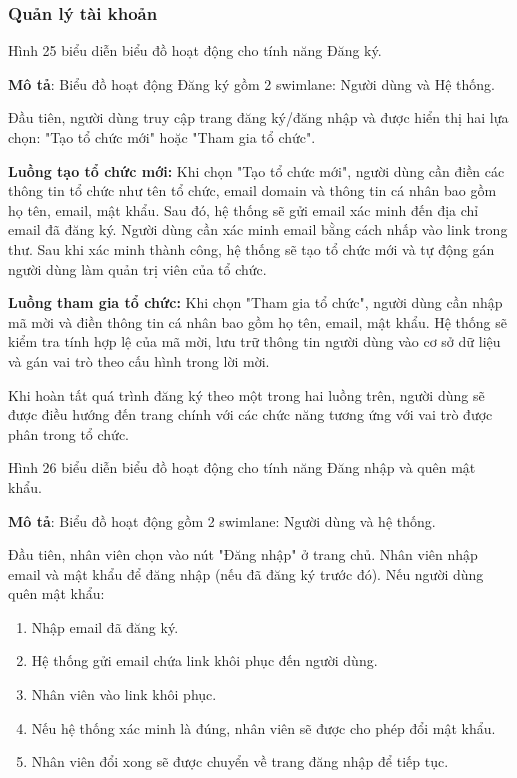 \subsubsection{Quản lý tài khoản}
Hình 25 biểu diễn biểu đồ hoạt động cho tính năng Đăng ký.

\textbf{Mô tả}: Biểu đồ hoạt động Đăng ký gồm 2 swimlane: Người dùng và Hệ thống.

Đầu tiên, người dùng truy cập trang đăng ký/đăng nhập và được hiển thị hai lựa chọn: "Tạo tổ chức mới" hoặc "Tham gia tổ chức". 

\textbf{Luồng tạo tổ chức mới:}
Khi chọn "Tạo tổ chức mới", người dùng cần điền các thông tin tổ chức như tên tổ chức, email domain và thông tin cá nhân bao gồm họ tên, email, mật khẩu. Sau đó, hệ thống sẽ gửi email xác minh đến địa chỉ email đã đăng ký. Người dùng cần xác minh email bằng cách nhấp vào link trong thư. Sau khi xác minh thành công, hệ thống sẽ tạo tổ chức mới và tự động gán người dùng làm quản trị viên của tổ chức.

\textbf{Luồng tham gia tổ chức:}
Khi chọn "Tham gia tổ chức", người dùng cần nhập mã mời và điền thông tin cá nhân bao gồm họ tên, email, mật khẩu. Hệ thống sẽ kiểm tra tính hợp lệ của mã mời, lưu trữ thông tin người dùng vào cơ sở dữ liệu và gán vai trò theo cấu hình trong lời mời.

Khi hoàn tất quá trình đăng ký theo một trong hai luồng trên, người dùng sẽ được điều hướng đến trang chính với các chức năng tương ứng với vai trò được phân trong tổ chức.

Hình 26 biểu diễn biểu đồ hoạt động cho tính năng Đăng nhập và quên mật khẩu.

\textbf{Mô tả}: Biểu đồ hoạt động gồm 2 swimlane: Người dùng và hệ thống.

Đầu tiên, nhân viên chọn vào nút "Đăng nhập" ở trang chủ. Nhân viên nhập email và mật khẩu để đăng nhập (nếu đã đăng ký trước đó). Nếu người dùng quên mật khẩu:
	\begin{enumerate}
		\item Nhập email đã đăng ký.
		\item Hệ thống gửi email chứa link khôi phục đến người dùng.
		\item Nhân viên vào link khôi phục.
		\item Nếu hệ thống xác minh là đúng, nhân viên sẽ được cho phép đổi mật khẩu.
		\item Nhân viên đổi xong sẽ được chuyển về trang đăng nhập để tiếp tục.
	\end{enumerate}

